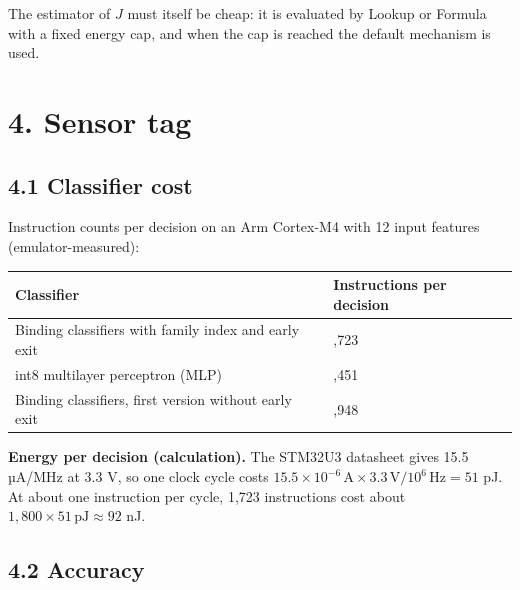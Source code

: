 \documentclass[10pt,letterpaper]{article}
\newcounter{none}
\begin{document}
The estimator of \(J\) must itself be cheap: it is evaluated by Lookup
or Formula with a fixed energy cap, and when the cap is reached the
default mechanism is used.

\section{4. Sensor tag}\label{sensor-tag}

\subsection{4.1 Classifier cost}\label{classifier-cost}

Instruction counts per decision on an Arm Cortex-M4 with 12 input
features (emulator-measured):

{\def\LTcaptype{none} %
{\footnotesize\setlength{\tabcolsep}{3.8pt}\renewcommand{\arraystretch}{1.15}
\begin{longtable}[]{@{}
  >{\raggedright\arraybackslash}p{}
  >{\raggedright\arraybackslash}p{}@{}}
\toprule\noalign{}
\begin{minipage}[b]{\linewidth}\raggedright
\textbf{Classifier}
\end{minipage} & \begin{minipage}[b]{\linewidth}\raggedright
\textbf{Instructions per decision}
\end{minipage} \\
\midrule\noalign{}
\endhead
\bottomrule\noalign{}
\endlastfoot
Binding classifiers with family index and early exit & 1,723 \\
int8 multilayer perceptron (MLP) & 2,451 \\
Binding classifiers, first version without early exit & 6,948 \\
\end{longtable}
}
}

\textbf{Energy per decision (calculation).} The STM32U3 datasheet gives
15.5 µA/MHz at 3.3 V, so one clock cycle costs
\(15.5 \times 10^{-6}\,\text{A} \times 3.3\,\text{V} / 10^6\,\text{Hz} = 51\)
pJ. At about one instruction per cycle, 1,723 instructions cost about
\(1{,}800 \times 51\,\text{pJ} \approx 92\) nJ.

\subsection{4.2 Accuracy}\label{accuracy}
\end{document}
